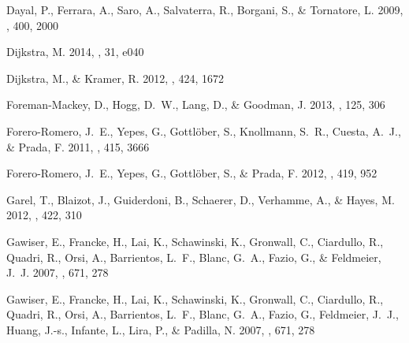 \documentclass{emulateapj}
\begin{document}
\begin{thebibliography}{38}
{Dayal}, P., {Ferrara}, A., {Saro}, A., {Salvaterra}, R., {Borgani}, S., \&
  {Tornatore}, L. 2009, \mnras, 400, 2000

{Dijkstra}, M. 2014, \pasa, 31, e040

{Dijkstra}, M., \& {Kramer}, R. 2012, \mnras, 424, 1672

{Foreman-Mackey}, D., {Hogg}, D.~W., {Lang}, D., \& {Goodman}, J. 2013, \pasp,
  125, 306

{Forero-Romero}, J.~E., {Yepes}, G., {Gottl{\"o}ber}, S., {Knollmann}, S.~R.,
  {Cuesta}, A.~J., \& {Prada}, F. 2011, \mnras, 415, 3666

{Forero-Romero}, J.~E., {Yepes}, G., {Gottl{\"o}ber}, S., \& {Prada}, F. 2012,
  \mnras, 419, 952

{Garel}, T., {Blaizot}, J., {Guiderdoni}, B., {Schaerer}, D., {Verhamme}, A.,
  \& {Hayes}, M. 2012, \mnras, 422, 310

{Gawiser}, E., {Francke}, H., {Lai}, K., {Schawinski}, K., {Gronwall}, C.,
  {Ciardullo}, R., {Quadri}, R., {Orsi}, A., {Barrientos}, L.~F., {Blanc},
  G.~A., {Fazio}, G., \& {Feldmeier}, J.~J. 2007{}, \apj, 671, 278

{Gawiser}, E., {Francke}, H., {Lai}, K., {Schawinski}, K., {Gronwall}, C.,
  {Ciardullo}, R., {Quadri}, R., {Orsi}, A., {Barrientos}, L.~F., {Blanc},
  G.~A., {Fazio}, G., {Feldmeier}, J.~J., {Huang}, J.-s., {Infante}, L.,
  {Lira}, P., \& {Padilla}, N. 2007{}, \apj, 671, 278


\end{thebibliography}
\end{document}
